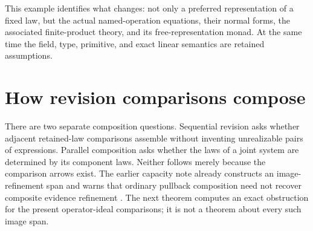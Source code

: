 \documentclass[11pt]{article}
\theoremstyle{definition}
\theoremstyle{remark}\newtheorem{remark}[theorem]{Remark}
\begin{document}
This example identifies what changes: not only a preferred representation
of a fixed law, but the actual named-operation equations, their normal
forms, the associated finite-product theory, and its free-representation
monad. At the same time the field, type, primitive, and exact linear
semantics are retained assumptions.



\section{How revision comparisons compose}
\label{sec:composition}
There are two separate composition questions. Sequential revision asks
whether adjacent retained-law comparisons assemble without inventing
unrealizable pairs of expressions. Parallel composition asks whether the
laws of a joint system are determined by its component laws. Neither follows
merely because the comparison arrows exist. The earlier capacity note
already constructs an image-refinement span and warns that ordinary
pullback composition need not recover composite evidence refinement
\cite[``Canonical comparison span and obstruction to a lift'']{capacity-note}.
The next theorem computes an exact obstruction for the present
operator-ideal comparisons; it is not a theorem about every such image span.
\end{document}
